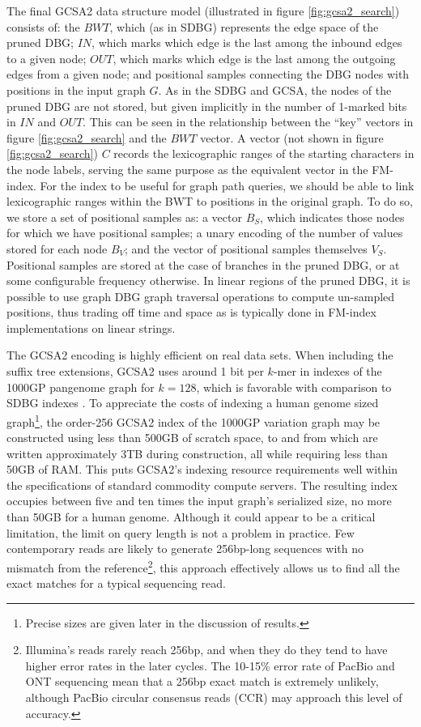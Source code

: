 The final GCSA2 data structure model (illustrated in figure \ref{fig:gcsa2_search}) consists of: the $BWT$, which (as in SDBG) represents the edge space of the pruned DBG; $IN$, which marks which edge is the last among the inbound edges to a given node; $OUT$, which marks which edge is the last among the outgoing edges from a given node; and positional samples connecting the DBG nodes with positions in the input graph $G$.
As in the SDBG and GCSA, the nodes of the pruned DBG are not stored, but given implicitly in the number of 1-marked bits in $IN$ and $OUT$.
This can be seen in the relationship between the ``key'' vectors in figure \ref{fig:gcsa2_search} and the $BWT$ vector.
A vector (not shown in figure \ref{fig:gcsa2_search}) $C$ records the lexicographic ranges of the starting characters in the node labels, serving the same purpose as the equivalent vector in the FM-index.
For the index to be useful for graph path queries, we should be able to link lexicographic ranges within the BWT to positions in the original graph.
To do so, we store a set of positional samples as: a vector $B_S$, which indicates those nodes for which we have positional samples; a unary encoding of the number of values stored for each node $B_V$; and the vector of positional samples themselves $V_S$.
Positional samples are stored at the case of branches in the pruned DBG, or at some configurable frequency otherwise.
In linear regions of the pruned DBG, it is possible to use graph DBG graph traversal operations to compute un-sampled positions, thus trading off time and space as is typically done in FM-index implementations on linear strings.

The GCSA2 encoding is highly efficient on real data sets.
When including the suffix tree extensions, GCSA2 uses around 1 bit per $k$-mer in indexes of the 1000GP pangenome graph for $k=128$, which is favorable with comparison to SDBG indexes \cite{siren2017indexing}.
To appreciate the costs of indexing a human genome sized graph\footnote{Precise sizes are given later in the discussion of results.}, the order-256 GCSA2 index of the 1000GP variation graph may be constructed using less than 500GB of scratch space, to and from which are written approximately 3TB during construction, all while requiring less than 50GB of RAM.
This puts GCSA2's indexing resource requirements well within the specifications of standard commodity compute servers.
The resulting index occupies between five and ten times the input graph's serialized size, no more than 50GB for a human genome.
Although it could appear to be a critical limitation, the limit on query length is not a problem in practice.
Few contemporary reads are likely to generate 256bp-long sequences with no mismatch from the reference\footnote{Illumina's reads rarely reach 256bp, and when they do they tend to have higher error rates in the later cycles. The 10-15\% error rate of PacBio and ONT sequencing mean that a 256bp exact match is extremely unlikely, although PacBio circular consensus reads (CCR) may approach this level of accuracy.}, this approach effectively allows us to find all the exact matches for a typical sequencing read.




